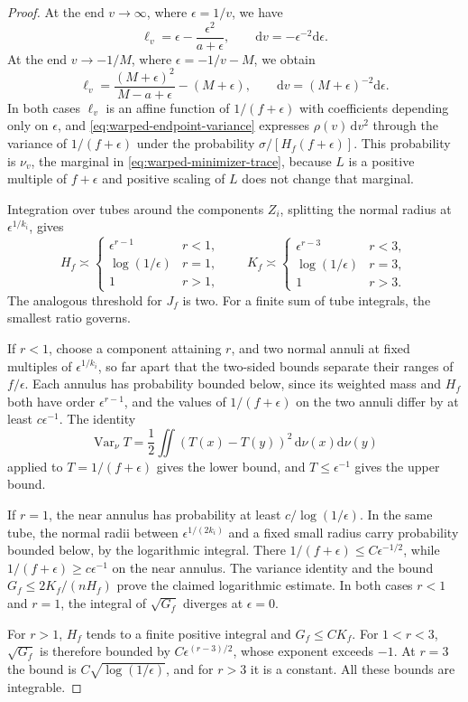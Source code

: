 \begin{proof}
At the end $v\to\infty$, where $\epsilon=1/v$, we have
\[
 \ell_v=\epsilon-\frac{\epsilon^2}{a+\epsilon},\qquad
 \mathrm{d}v=-\epsilon^{-2}\mathrm{d}\epsilon.
\]
At the end $v\to-1/M$, where $\epsilon=-1/v-M$, we obtain
\[
 \ell_v=\frac{(M+\epsilon)^2}{M-a+\epsilon}-(M+\epsilon),
 \qquad \mathrm{d}v=(M+\epsilon)^{-2}\mathrm{d}\epsilon.
\]
In both cases $\ell_v$ is an affine function of $1/(f+\epsilon)$ with coefficients depending only on $\epsilon$, and \eqref{eq:warped-endpoint-variance} expresses $\rho(v)\,\mathrm{d}v^2$ through the variance of $1/(f+\epsilon)$ under the probability $\sigma/[H_f(f+\epsilon)]$. This probability is $\nu_v$, the marginal in \eqref{eq:warped-minimizer-trace}, because $L$ is a positive multiple of $f+\epsilon$ and positive scaling of $L$ does not change that marginal.

Integration over tubes around the components $Z_i$, splitting the normal radius at $\epsilon^{1/k_i}$, gives
\[
 H_f\asymp
 \begin{cases}\epsilon^{r-1}&r<1,\\
 \log(1/\epsilon)&r=1,\\1&r>1,
 \end{cases}
 \qquad
 K_f\asymp
 \begin{cases}\epsilon^{r-3}&r<3,\\
 \log(1/\epsilon)&r=3,\\1&r>3.
 \end{cases}
\]
The analogous threshold for $J_f$ is two. For a finite sum of tube integrals, the smallest ratio governs.

If $r<1$, choose a component attaining $r$, and two normal annuli at fixed multiples of $\epsilon^{1/k_i}$, so far apart that the two-sided bounds separate their ranges of $f/\epsilon$. Each annulus has probability bounded below, since its weighted mass and $H_f$ both have order $\epsilon^{r-1}$, and the values of $1/(f+\epsilon)$ on the two annuli differ by at least $c\epsilon^{-1}$. The identity
\[
 \operatorname{Var}_\nu T
   =\frac12\iint(T(x)-T(y))^2\,\mathrm{d}\nu(x)\mathrm{d}\nu(y)
\]
applied to $T=1/(f+\epsilon)$ gives the lower bound, and $T\leq\epsilon^{-1}$ gives the upper bound.

If $r=1$, the near annulus has probability at least $c/\log(1/\epsilon)$. In the same tube, the normal radii between $\epsilon^{1/(2k_i)}$ and a fixed small radius carry probability bounded below, by the logarithmic integral. There $1/(f+\epsilon)\leq C\epsilon^{-1/2}$, while $1/(f+\epsilon)\geq c\epsilon^{-1}$ on the near annulus. The variance identity and the bound $G_f\leq2K_f/(nH_f)$ prove the claimed logarithmic estimate. In both cases $r<1$ and $r=1$, the integral of $\sqrt{G_f}$ diverges at $\epsilon=0$.

For $r>1$, $H_f$ tends to a finite positive integral and $G_f\leq C K_f$. For $1<r<3$, $\sqrt{G_f}$ is therefore bounded by $C\epsilon^{(r-3)/2}$, whose exponent exceeds $-1$. At $r=3$ the bound is $C\sqrt{\log(1/\epsilon)}$, and for $r>3$ it is a constant. All these bounds are integrable.
\end{proof}

